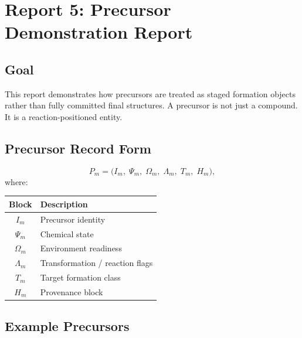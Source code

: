 \documentclass[11pt, a4paper, oneside]{article}
\begin{document}
\section{Report 5: Precursor Demonstration Report}
\label{sec:report5}

\subsection{Goal}

This report demonstrates how precursors are treated as staged formation objects
rather than fully committed final structures.  A precursor is not just a
compound.  It is a reaction-positioned entity.

\subsection{Precursor Record Form}

\begin{equation}
\label{eq:precursor_record}
P_m = \bigl(I_m,\; \Psi_m,\; \Omega_m,\; \Lambda_m,\; T_m,\; H_m\bigr),
\end{equation}
where:
\begin{center}
\begin{tabular}{@{} cl @{}}
\toprule
\textbf{Block} & \textbf{Description}\\
\midrule
$I_m$        & Precursor identity\\
$\Psi_m$     & Chemical state\\
$\Omega_m$   & Environment readiness\\
$\Lambda_m$  & Transformation / reaction flags\\
$T_m$        & Target formation class\\
$H_m$        & Provenance block\\
\bottomrule
\end{tabular}
\end{center}

\subsection{Example Precursors}
\end{document}
